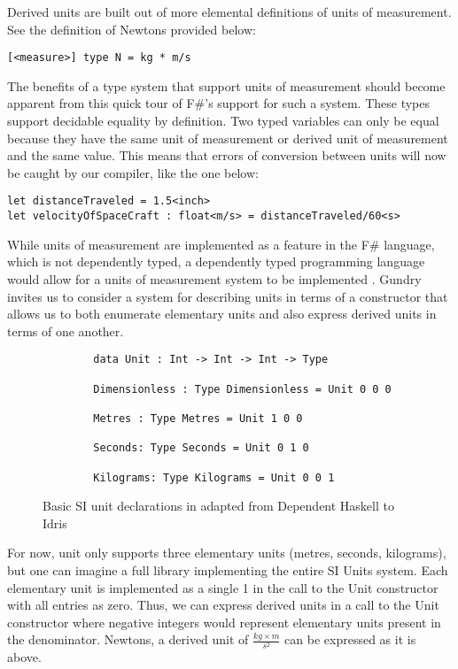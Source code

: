 Derived units are built out of more elemental definitions of units of
measurement. See the definition of Newtons provided below: 

\texttt{[<measure>] type N = kg * m/s}

The benefits of a type system that support units of measurement should become
apparent from this quick tour of F\#'s support for such a system. These types
support decidable equality by definition. Two typed variables can only be equal
because they have the same unit of measurement or derived unit of measurement
and the same value. This means that errors of conversion between units will now
be caught by our compiler, like the one below: 

\texttt{let distanceTraveled = 1.5<inch>}\\
\texttt{let velocityOfSpaceCraft : float<m/s> = distanceTraveled/60<s>}

While units of measurement are implemented as a feature in the F\# language,
which is not dependently typed, a dependently typed programming language would
allow for a units of measurement system to be implemented \cite{gundry2013}.
Gundry invites us to consider a system for describing units in terms of a
constructor that allows us to both enumerate elementary units and also express
derived units in terms of one another. 

\begin{figure}[h]
    \caption{Basic SI unit declarations in adapted from Dependent Haskell to
    Idris \cite{gundry2013}}
    \begin{lstlisting}
        data Unit : Int -> Int -> Int -> Type
        
        Dimensionless : Type Dimensionless = Unit 0 0 0
        
        Metres : Type Metres = Unit 1 0 0
        
        Seconds: Type Seconds = Unit 0 1 0
        
        Kilograms: Type Kilograms = Unit 0 0 1
    \end{lstlisting}
\end{figure}

For now, unit only supports three elementary units (metres, seconds, kilograms),
but one can imagine a full library implementing the entire SI Units system. Each
elementary unit is implemented as a single 1 in the call to the Unit constructor
with all entries as zero. Thus, we can express derived units in a call to the
Unit constructor where negative integers would represent elementary units
present in the denominator. Newtons, a derived unit of $\frac{kg \times m}{s^2}$
can be expressed as it is above. 

